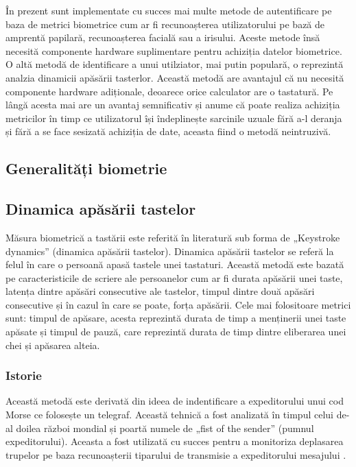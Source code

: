 \documentclass[9pt,shortpaper,twoside,web]{ieeecolor}
\begin{document}
	În prezent sunt implementate cu succes mai multe metode de autentificare pe baza de metrici biometrice cum ar fi recunoașterea utilizatorului pe bază de amprentă papilară, recunoașterea facială sau a irisului. Aceste metode însă necesită componente hardware suplimentare pentru achiziția datelor biometrice. O altă metodă de identificare a unui utilziator, mai putin populară, o reprezintă analzia dinamicii apăsării tasterlor. Această metodă are avantajul că nu necesită componente hardware adiționale, deoarece orice calculator are o tastatură. Pe lângă acesta mai are un avantaj semnificativ și anume că poate realiza achiziția metricilor în timp ce utilizatorul își îndeplinește sarcinile uzuale fără a-l deranja și fără a se face sesizată achiziția de date, aceasta fiind o metodă neintruzivă.

\subsection{Generalități biometrie}



\subsection{Dinamica apăsării tastelor}
	Măsura biometrică a tastării este referită în literatură sub forma de „Keystroke dynamics” (dinamica apăsării tastelor). Dinamica apăsării tastelor se referă la felul în care o persoană apasă tastele unei tastaturi. Această metodă este bazată pe caracteristicile de scriere ale persoanelor cum ar fi durata apăsării unei taste, latența dintre apăsări consecutive ale tastelor, timpul dintre două apăsări consecutive și în cazul în care se poate, forța apăsării. Cele mai folositoare metrici sunt: timpul de apăsare, acesta reprezintă durata de timp a menținerii unei taste apăsate și timpul de pauză, care reprezintă durata de timp dintre eliberarea unei chei și apăsarea alteia.

\subsubsection{Istorie}	
	Această metodă este derivată din ideea de indentificare a expeditorului unui cod Morse ce folosește un telegraf. Această tehnică a fost analizată în timpul celui de-al doilea război mondial și poartă numele de „fist of the sender” (pumnul expeditorului). Aceasta a fost utilizată cu succes pentru a monitoriza deplasarea trupelor pe baza recunoașterii tiparului de transmisie a expeditorului mesajului \cite{b2}.
\end{document}

